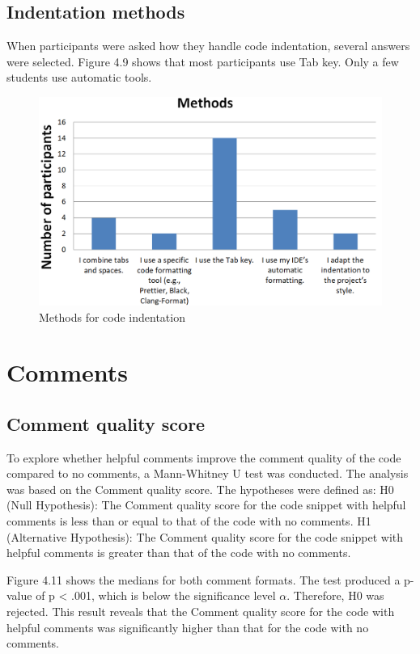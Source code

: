 \subsection{Indentation methods}
When participants were asked how they handle code indentation, several answers were selected. Figure 4.9 shows that most participants use Tab key. Only a few students use automatic tools.  

\begin{figure} [H]
  \centering
  \includegraphics[scale=0.8]{figures/inM.png}
  \caption{Methods for code indentation}
  \label{fig:AnhangsChor}
\end{figure}



\section{Comments}

\subsection{Comment quality score}

To explore whether helpful comments improve the comment quality of the code compared to no comments, a Mann-Whitney U test was conducted.  The analysis was based on the Comment quality score. The hypotheses were defined as: H0 (Null Hypothesis): The Comment quality score for the code snippet with helpful comments is less than or equal to that of the code with no comments.  H1 (Alternative Hypothesis): The Comment quality score for the code snippet with helpful comments is greater than that of the code with no comments.

Figure 4.11 shows the medians for both comment formats.
The test produced a p-value of p < .001, which is below the significance level $\alpha$. Therefore, H0 was rejected. This result reveals that the Comment quality score for the code with helpful comments was significantly higher than that for the code with no comments.

